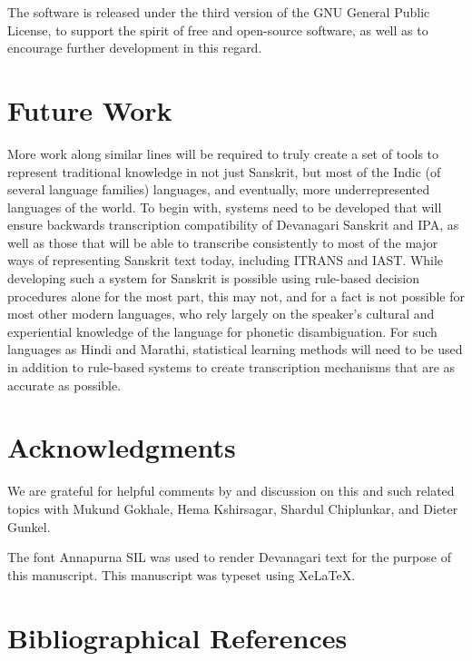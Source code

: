 \documentclass[10pt,a4paper]{article}
\begin{document}
The software is released under the third version of the GNU General Public License, to support the spirit of free and open-source software, as well as to encourage further development in this regard.

\section{Future Work}
More work along similar lines will be required to truly create a set of tools to represent traditional knowledge in not just Sanskrit, but most of the Indic (of several language families) languages, and eventually, more underrepresented languages of the world. To begin with, systems need to be developed that will ensure backwards transcription compatibility of Devanagari Sanskrit and IPA, as well as those that will be able to transcribe consistently to most of the major ways of representing Sanskrit text today, including ITRANS and IAST.
While developing such a system for Sanskrit is possible using rule-based decision procedures alone for the most part, this may not, and for a fact is not possible for most other modern languages, who rely largely on the speaker's cultural and experiential knowledge of the language for phonetic disambiguation. For such languages as Hindi and Marathi, statistical learning methods will need to be used in addition to rule-based systems to create transcription mechanisms that are as accurate as possible.

\section{Acknowledgments}
We are grateful for helpful comments by and discussion on this and such related topics with Mukund Gokhale, Hema Kshirsagar, Shardul Chiplunkar, and Dieter Gunkel.

The font Annapurna SIL was used to render Devanagari text for the purpose of this manuscript.
This manuscript was typeset using Xe\LaTeX.

\section{Bibliographical References}
\label{main:ref}





	
\end{document}
